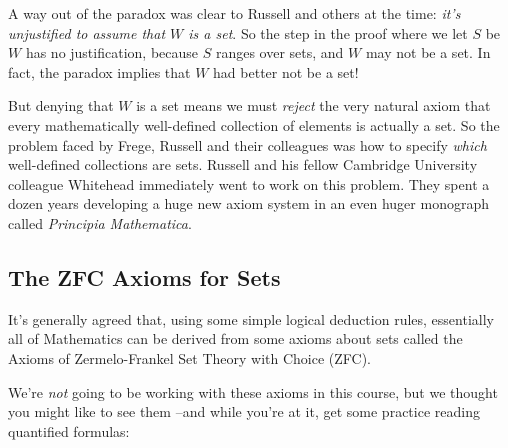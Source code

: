 
A way out of the paradox was clear to Russell and others at the time:
\emph{it's unjustified to assume that $W$ is a set}.  So the step in the
proof where we let $S$ be $W$ has no justification, because $S$ ranges
over sets, and $W$ may not be a set.  In fact, the paradox implies that
$W$ had better not be a set!

But denying that $W$ is a set means we must \emph{reject} the very natural
axiom that every mathematically well-defined collection of elements is
actually a set.  So the problem faced by Frege, Russell and their
colleagues was how to specify \emph{which} well-defined collections are
sets.  Russell and his fellow Cambridge University colleague Whitehead
immediately went to work on this problem.  They spent a dozen years
developing a huge new axiom system in an even huger monograph called
\emph{Principia Mathematica}.


\subsection{The ZFC Axioms for Sets}
It's generally agreed that, using some simple logical deduction rules,
essentially all of Mathematics can be derived from some axioms about sets
called the Axioms of Zermelo-Frankel Set Theory with Choice (ZFC).

We're \textit{not} going to be working with these axioms in this course,
but we thought you might like to see them --and while you're at it, get
some practice reading quantified formulas:
%

